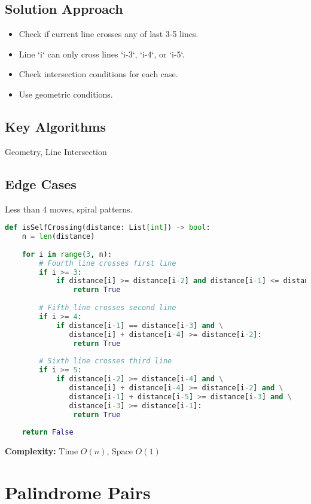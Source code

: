 \documentclass[10pt, a4paper]{article}
\begin{document}
\subsection*{Solution Approach}
\begin{itemize}
    \item Check if current line crosses any of last 3-5 lines.
    \item Line `i` can only cross lines `i-3`, `i-4`, or `i-5`.
    \item Check intersection conditions for each case.
    \item Use geometric conditions.
\end{itemize}

\subsection*{Key Algorithms}
Geometry, Line Intersection

\subsection*{Edge Cases}
Less than 4 moves, spiral patterns.

\begin{lstlisting}[language=Python]
def isSelfCrossing(distance: List[int]) -> bool:
    n = len(distance)
    
    for i in range(3, n):
        # Fourth line crosses first line
        if i >= 3:
            if distance[i] >= distance[i-2] and distance[i-1] <= distance[i-3]:
                return True
        
        # Fifth line crosses second line
        if i >= 4:
            if distance[i-1] == distance[i-3] and \
               distance[i] + distance[i-4] >= distance[i-2]:
                return True
        
        # Sixth line crosses third line
        if i >= 5:
            if distance[i-2] >= distance[i-4] and \
               distance[i] + distance[i-4] >= distance[i-2] and \
               distance[i-1] + distance[i-5] >= distance[i-3] and \
               distance[i-3] >= distance[i-1]:
                return True
    
    return False
\end{lstlisting}
\textbf{Complexity:} Time $O(n)$, Space $O(1)$

\section{Palindrome Pairs}
\end{document}
